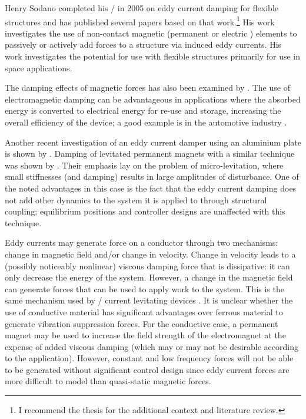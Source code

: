 \documentclass[11pt,a4paper]{memoir}
\begin{document}
Henry Sodano completed his \PhD/{} in 2005 \cite{sodano2005thesis} on
eddy current damping for flexible structures and has published several
papers based on that work.\footnote{I recommend the thesis for the
  additional context and literature review.} His work investigates the
use of non-contact magnetic (permanent \cite{sodano2005,sodano2006,sodano2008-dsmc} or
electric \cite{sodano2007}) elements to passively \cite{sodano2005} or
actively \cite{sodano2006,sodano2007,sodano2008-dsmc} add forces to a structure via
induced eddy currents. His work investigates the potential for use
with flexible structures primarily for use in space
applications.

The damping effects of magnetic forces has also been examined by
\textcite{bonisoli2006}. The use of electromagnetic damping can be
advantageous in applications where the absorbed energy is converted to
electrical energy for re-use and storage, increasing the overall
efficiency of the device; a good example is in the automotive industry
\cite{graves2000thesis}.

Another recent investigation of an eddy current damper using an aluminium
plate is shown by \textcite{ebrahimi2008}. Damping of levitated permanent
magnets with a similar technique was shown by \textcite{elbuken2006}. Their
emphasis lay on the problem of micro-levitation, where small stiffnesses (and
damping) results in large amplitudes of disturbance. One of the noted
advantages in this case is the fact that the eddy current damping does not add
other dynamics to the system it is applied to through structural coupling; equilibrium positions
and controller designs are unaffected with this technique.

Eddy currents may generate force on a conductor through two mechanisms: change in magnetic field and/or change in velocity.
Change in velocity leads to a (possibly noticeably nonlinear) viscous damping force that
is dissipative: it can only decrease the energy of the system.
However, a change in the magnetic field can generate forces that can be used to apply work to the system.
This is the same mechanism used by \AC/ current levitating devices \cite{laithwaite1965}.
It is unclear whether the use of conductive material has significant advantages over  ferrous material to generate vibration suppression forces.
For the conductive case, a permanent magnet may be used to increase the field strength of the electromagnet at the expense of added viscous damping (which may or may not be desirable according to the application).
However, constant and low frequency forces will not be able to be generated without significant control design since eddy current forces are more difficult to model than quasi-static magnetic forces.
\end{document}
